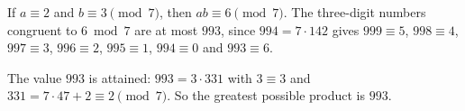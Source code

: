 If $a\equiv2$ and $b\equiv3\pmod7$, then $ab\equiv6\pmod7$. The three-digit numbers congruent to $6\bmod 7$ are at most $993$, since $994=7\cdot142$ gives $999\equiv5$, $998\equiv4$, $997\equiv3$, $996\equiv2$, $995\equiv1$, $994\equiv0$ and $993\equiv6$.

The value $993$ is attained: $993=3\cdot331$ with $3\equiv3$ and $331=7\cdot47+2\equiv2\pmod7$. So the greatest possible product is $\boxed{993}$.
